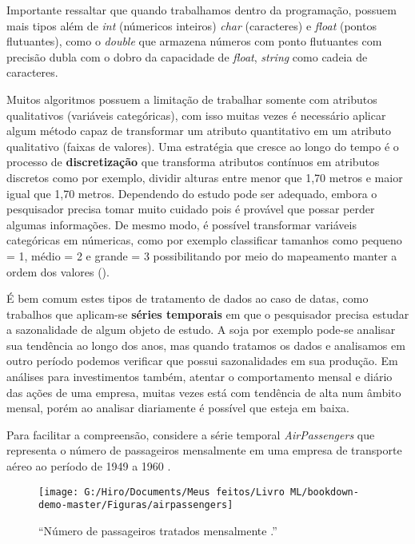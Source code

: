 \documentclass[
  openany]{book}
\begin{document}
Importante ressaltar que quando trabalhamos dentro da programação, possuem mais tipos além de \emph{int} (númericos inteiros) \emph{char} (caracteres) e \emph{float} (pontos flutuantes), como o \emph{double} que armazena números com ponto flutuantes com precisão dubla com o dobro da capacidade de \emph{float}, \emph{string} como cadeia de caracteres.

Muitos algoritmos possuem a limitação de trabalhar somente com atributos qualitativos (variáveis categóricas), com isso muitas vezes é necessário aplicar algum método capaz de transformar um atributo quantitativo em um atributo qualitativo (faixas de valores). Uma estratégia que cresce ao longo do tempo é o processo de \textbf{discretização} que transforma atributos contínuos em atributos discretos como por exemplo, dividir alturas entre menor que 1,70 metros e maior igual que 1,70 metros. Dependendo do estudo pode ser adequado, embora o pesquisador precisa tomar muito cuidado pois é provável que possar perder algumas informações. De mesmo modo, é possível transformar variáveis categóricas em númericas, como por exemplo classificar tamanhos como pequeno = 1, médio = 2 e grande = 3 possibilitando por meio do mapeamento manter a ordem dos valores (\citet{batista2003pre}).

É bem comum estes tipos de tratamento de dados ao caso de datas, como trabalhos que aplicam-se \textbf{séries temporais} em que o pesquisador precisa estudar a sazonalidade de algum objeto de estudo. A soja por exemplo pode-se analisar sua tendência ao longo dos anos, mas quando tratamos os dados e analisamos em outro período podemos verificar que possui sazonalidades em sua produção. Em análises para investimentos também, atentar o comportamento mensal e diário das ações de uma empresa, muitas vezes está com tendência de alta num âmbito mensal, porém ao analisar diariamente é possível que esteja em baixa.

Para facilitar a compreensão, considere a série temporal \emph{AirPassengers} que representa o número de passageiros mensalmente em uma empresa de transporte aéreo ao período de 1949 a 1960 \citep{box1976time}.

\begin{figure}

{\centering \texttt{[image: G:/Hiro/Documents/Meus feitos/Livro ML/bookdown-demo-master/Figuras/airpassengers]} 

}

\caption{``Número de passageiros tratados mensalmente \citep{box1976time}.''}\label{fig:airpassengers}
\end{figure}
\end{document}
